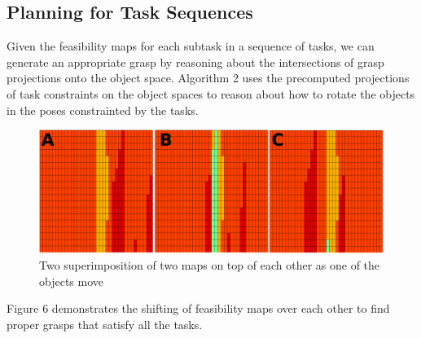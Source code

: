 \documentclass[a4paper,10pt,twocolumn]{article}
\begin{document}

\subsection{Planning for Task Sequences}

Given the feasibility maps for each subtask in a sequence of tasks,  we
can generate an appropriate grasp by reasoning about the intersections of grasp projections onto the object space. 
Algorithm 2 uses the precomputed projections of task constraints on the object spaces to reason about how to rotate the objects in the poses constrainted  by the tasks. 


\begin{figure}[t]
  \begin{center}
    \includegraphics[width=1.0\linewidth]{./images/sequential.png} \quad 
  \end{center}
  \caption{Two superimposition of two maps on top of each other as one of the objects move}
  \label{fig:sequential}
\end{figure}



Figure 6 demonstrates the shifting of feasibility maps over each other to find proper grasps that satisfy all the tasks. 
\end{document}
